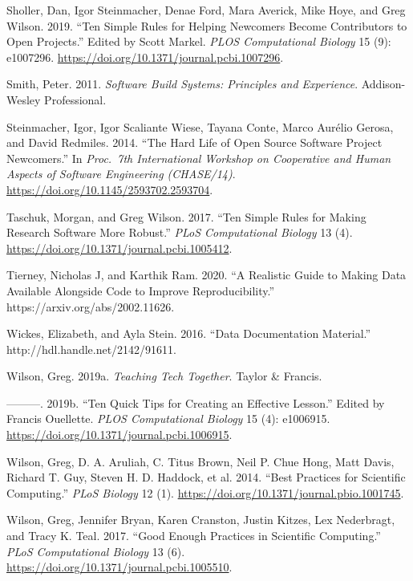 \documentclass[
]{krantz}
\newlength{\cslhangindent}
\newenvironment{cslreferences}%
  {\setlength{\parindent}{0pt}%
  \everypar{\setlength{\hangindent}{\cslhangindent}}\ignorespaces}%
  {\par}
\begin{document}
\begin{cslreferences}
\leavevmode\hypertarget{ref-Shol2019}{}%
Sholler, Dan, Igor Steinmacher, Denae Ford, Mara Averick, Mike Hoye, and Greg Wilson. 2019. ``Ten Simple Rules for Helping Newcomers Become Contributors to Open Projects.'' Edited by Scott Markel. \emph{PLOS Computational Biology} 15 (9): e1007296. \url{https://doi.org/10.1371/journal.pcbi.1007296}.

\leavevmode\hypertarget{ref-Smit2011}{}%
Smith, Peter. 2011. \emph{Software Build Systems: Principles and Experience}. Addison-Wesley Professional.

\leavevmode\hypertarget{ref-Stei2014}{}%
Steinmacher, Igor, Igor Scaliante Wiese, Tayana Conte, Marco Aurélio Gerosa, and David Redmiles. 2014. ``The Hard Life of Open Source Software Project Newcomers.'' In \emph{Proc.~7th International Workshop on Cooperative and Human Aspects of Software Engineering (CHASE/14)}. \url{https://doi.org/10.1145/2593702.2593704}.

\leavevmode\hypertarget{ref-Tasc2017}{}%
Taschuk, Morgan, and Greg Wilson. 2017. ``Ten Simple Rules for Making Research Software More Robust.'' \emph{PLoS Computational Biology} 13 (4). \url{https://doi.org/10.1371/journal.pcbi.1005412}.

\leavevmode\hypertarget{ref-Tier2020}{}%
Tierney, Nicholas J, and Karthik Ram. 2020. ``A Realistic Guide to Making Data Available Alongside Code to Improve Reproducibility.'' https://arxiv.org/abs/2002.11626.

\leavevmode\hypertarget{ref-Wick2016}{}%
Wickes, Elizabeth, and Ayla Stein. 2016. ``Data Documentation Material.'' http://hdl.handle.net/2142/91611.

\leavevmode\hypertarget{ref-Wils2018}{}%
Wilson, Greg. 2019a. \emph{Teaching Tech Together}. Taylor \& Francis.

\leavevmode\hypertarget{ref-Wils2019}{}%
---------. 2019b. ``Ten Quick Tips for Creating an Effective Lesson.'' Edited by Francis Ouellette. \emph{PLOS Computational Biology} 15 (4): e1006915. \url{https://doi.org/10.1371/journal.pcbi.1006915}.

\leavevmode\hypertarget{ref-Wils2014}{}%
Wilson, Greg, D. A. Aruliah, C. Titus Brown, Neil P. Chue Hong, Matt Davis, Richard T. Guy, Steven H. D. Haddock, et al. 2014. ``Best Practices for Scientific Computing.'' \emph{PLoS Biology} 12 (1). \url{https://doi.org/10.1371/journal.pbio.1001745}.

\leavevmode\hypertarget{ref-Wils2017}{}%
Wilson, Greg, Jennifer Bryan, Karen Cranston, Justin Kitzes, Lex Nederbragt, and Tracy K. Teal. 2017. ``Good Enough Practices in Scientific Computing.'' \emph{PLoS Computational Biology} 13 (6). \url{https://doi.org/10.1371/journal.pcbi.1005510}.


\end{cslreferences}
\end{document}
